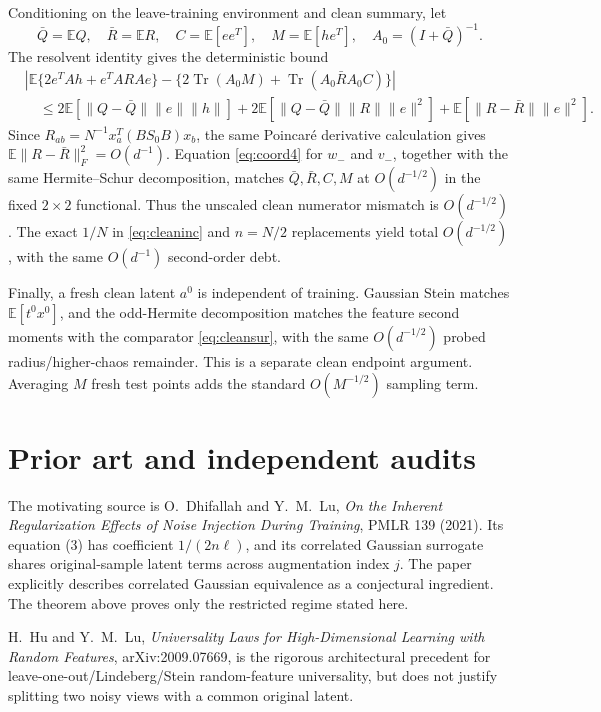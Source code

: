 \documentclass[11pt]{article}
\newcommand{\E}{\mathbb E}
\newcommand{\tr}{\operatorname{Tr}}
\begin{document}
Conditioning on the leave-training environment and clean summary, let
\[
 \bar Q=\E Q,\quad \bar R=\E R,\quad C=\E[ee^T],\quad M=\E[he^T],\quad A_0=(I+\bar Q)^{-1}.
\]
The resolvent identity gives the deterministic bound
\begin{align*}
&\left|\E\{2e^TAh+e^TARAe\}-\{2\tr(A_0M)+\tr(A_0\bar RA_0C)\}\right|\\
&\quad\le2\E[\|Q-\bar Q\|\|e\|\|h\|]
 +2\E[\|Q-\bar Q\|\|R\|\|e\|^2]
 +\E[\|R-\bar R\|\|e\|^2].
\end{align*}
Since \(R_{ab}=N^{-1}x_a^T(BS_0B)x_b\), the same Poincar\'e derivative calculation gives \(\E\|R-\bar R\|_F^2=O(d^{-1})\).  Equation \eqref{eq:coord4} for \(w_-\) and \(v_-\), together with the same Hermite--Schur decomposition, matches \(\bar Q,\bar R,C,M\) at \(O(d^{-1/2})\) in the fixed \(2\times2\) functional.  Thus the unscaled clean numerator mismatch is \(O(d^{-1/2})\).  The exact \(1/N\) in \eqref{eq:cleaninc} and \(n=N/2\) replacements yield total \(O(d^{-1/2})\), with the same \(O(d^{-1})\) second-order debt.

Finally, a fresh clean latent \(a^0\) is independent of training.  Gaussian Stein matches \(\E[t^0x^0]\), and the odd-Hermite decomposition matches the feature second moments with the comparator \eqref{eq:cleansur}, with the same \(O(d^{-1/2})\) probed radius/higher-chaos remainder.  This is a separate clean endpoint argument.  Averaging \(M\) fresh test points adds the standard \(O(M^{-1/2})\) sampling term.

\section{Prior art and independent audits}
The motivating source is O.~Dhifallah and Y.~M.~Lu, \emph{On the Inherent Regularization Effects of Noise Injection During Training}, PMLR 139 (2021).  Its equation (3) has coefficient \(1/(2n\ell)\), and its correlated Gaussian surrogate shares original-sample latent terms across augmentation index \(j\).  The paper explicitly describes correlated Gaussian equivalence as a conjectural ingredient.  The theorem above proves only the restricted regime stated here.

H.~Hu and Y.~M.~Lu, \emph{Universality Laws for High-Dimensional Learning with Random Features}, arXiv:2009.07669, is the rigorous architectural precedent for leave-one-out/Lindeberg/Stein random-feature universality, but does not justify splitting two noisy views with a common original latent.
\end{document}
